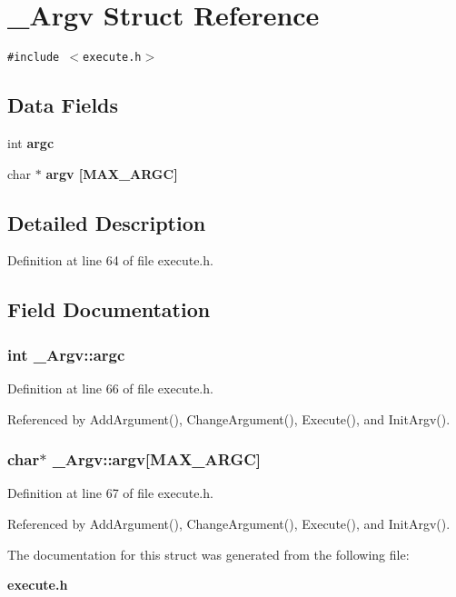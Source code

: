 \section{\_\-Argv Struct Reference}
\label{struct__Argv}
{\tt \#include $<$execute.h$>$}

\subsection*{Data Fields}
\begin{CompactItemize}
\item 
int \bf{argc}
\item 
char $\ast$ \bf{argv} [MAX\_\-ARGC]
\end{CompactItemize}


\subsection{Detailed Description}




Definition at line 64 of file execute.h.

\subsection{Field Documentation}
\subsubsection{\setlength{\rightskip}{0pt plus 5cm}int \bf{\_\-Argv::argc}}\label{struct__Argv_d8cd08ebc6285da2874f49a0ced271f4}




Definition at line 66 of file execute.h.

Referenced by Add\-Argument(), Change\-Argument(), Execute(), and Init\-Argv().
\subsubsection{\setlength{\rightskip}{0pt plus 5cm}char$\ast$ \bf{\_\-Argv::argv}[MAX\_\-ARGC]}\label{struct__Argv_ca065f7e43221e3d8b5f6093de1aa5bf}




Definition at line 67 of file execute.h.

Referenced by Add\-Argument(), Change\-Argument(), Execute(), and Init\-Argv().

The documentation for this struct was generated from the following file:\begin{CompactItemize}
\item 
\bf{execute.h}\end{CompactItemize}
